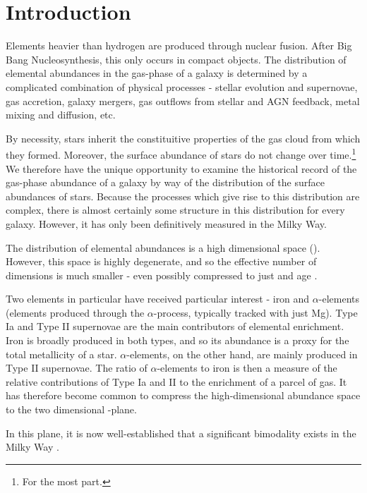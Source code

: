 \section{Introduction} \label{sec:intro}
Elements heavier than hydrogen are produced through nuclear fusion. After Big Bang Nucleosynthesis, this only occurs in compact objects. The distribution of elemental abundances in the gas-phase of a galaxy is determined by a complicated combination of physical processes - stellar evolution and supernovae, gas accretion, galaxy mergers, gas outflows from stellar and AGN feedback, metal mixing and diffusion, etc.

By necessity, stars inherit the constituitive properties of the gas cloud from which they formed. Moreover, the surface abundance of stars do not change over time.\footnote{For the most part.} We therefore have the unique opportunity to examine the historical record of the gas-phase abundance of a galaxy by way of the distribution of the surface abundances of stars. Because the processes which give rise to this distribution are complex, there is almost certainly some structure in this distribution for every galaxy. However, it has only been definitively measured in the Milky Way.

The distribution of elemental abundances is a high dimensional space (). However, this space is highly degenerate, and so the effective number of dimensions is much smaller - even possibly compressed to just \FeH and age \citep{2019ApJ...883..177N}.

Two elements in particular have received particular interest - iron and $\alpha$-elements (elements produced through the $\alpha$-process, typically tracked with just Mg). Type Ia and Type II supernovae are the main contributors of elemental enrichment. Iron is broadly produced in both types, and so its abundance is a proxy for the total metallicity of a star. $\alpha$-elements, on the other hand, are mainly produced in Type II supernovae. The ratio of $\alpha$-elements to iron is then a measure of the relative contributions of Type Ia and II to the enrichment of a parcel of gas. It has therefore become common to compress the high-dimensional abundance space to the two dimensional \FeH-\alphaFe plane.

In this plane, it is now well-established that a significant bimodality exists in the Milky Way .





